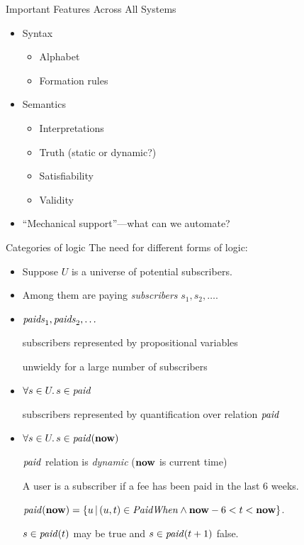 \documentclass[style=sailor,size=12pt]{powerdot}
\begin{document}
\begin{wideslide}[bm=,toc=]{Important Features Across All Systems} 
\begin{itemize}
\item Syntax
\begin{itemize}
\item<2-> Alphabet 
\item<2-> Formation rules
\end{itemize}
\item Semantics
\begin{itemize}
\item<3-> Interpretations
\item<3-> Truth (static or dynamic?)
\item<3-> Satisfiability
\item<3-> Validity
\end{itemize}
\item<4-> ``Mechanical support''---what can we automate?
\end{itemize}

\end{wideslide}


\begin{wideslide}[bm=,toc=]{Categories of logic}
The need for different forms of logic:
\begin{itemize}
\item Suppose $U$ is a universe of potential subscribers. 

\item Among them are paying {\em subscribers\/}
$s_1, s_2,\ldots$.

\item $\mbox{\it paids\/}_1,\mbox{\it paids\/}_2,\ldots$ 

\hspace{1em}subscribers represented by propositional variables

\hspace{1em}unwieldy for a large number of subscribers

\item $\forall s\in U.\,s\in \mbox{\it paid\/}$  

\hspace{1em}subscribers represented by quantification over relation $\mbox{\it paid\/}$

\item $\forall s\in U.\,s\in \mbox{\it paid\/}(\mbox{\bf now})$

\hspace{1em}$\mbox{\it paid\/}$ relation is {\em dynamic\/} ($\mbox{\bf now}$ is current time)

A user is a subscriber if a fee has been paid in the last 6 weeks.

$\mbox{\it paid\/}(\mbox{\bf now}) = \{u\,|\,(u,t)\in \mbox{\it PaidWhen\/} \wedge \mbox{\bf now}-6 < t < \mbox{\bf now}\}$.

$s\in\mbox{\it paid\/}(t)$ may be true and $s\in\mbox{\it paid\/}(t+1)$ false.

\end{itemize}
\end{wideslide}
\end{document}
